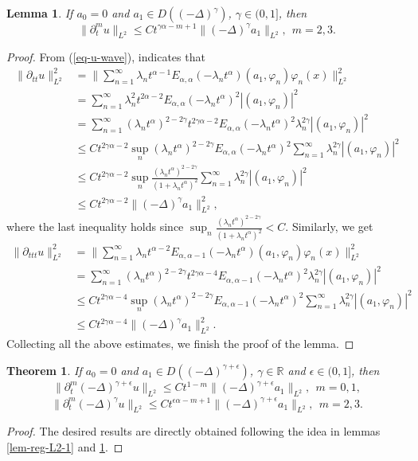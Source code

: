 \documentclass[11pt]{article}
\newtheorem{theorem}{Theorem}
\newtheorem{lemma}{Lemma}[section]
\numberwithin{equation}{section}
\begin{document}
\begin{lemma}\label{lem-reg-L2-2}
If $a_0=0$ and $a_1\in D((-\Delta)^{\gamma})$, $\gamma\in(0,1]$, then
\[
\|\partial_t^mu\|_{L^2}\le Ct^{\gamma\alpha-m+1}\|(-\Delta)^{\gamma}a_1\|_{L^2},~~m=2,3.
\]
\end{lemma}
\begin{proof}
From (\ref{eq-u-wave}), indicates that
\begin{align*}
\|\partial_{tt}u\|_{L^2}^2
& = \bigg\|\sum_{n=1}^{\infty}  \lambda_nt^{\alpha-1}E_{\alpha,\alpha}(-\lambda_n t^\alpha)(a_1, \varphi_n) \varphi_n(x)\bigg\|_{L^2}^2\\
& =\sum_{n=1}^{\infty}  \lambda_n^2t^{2\alpha-2}E_{\alpha,\alpha}(-\lambda_n t^\alpha)^2|(a_1, \varphi_n)|^2\\
& = \sum_{n=1}^{\infty}  (\lambda_nt^\alpha)^{2-2\gamma}t^{2\gamma\alpha-2}E_{\alpha,\alpha}(-\lambda_n t^\alpha)^2\lambda_n^{2\gamma}|(a_1, \varphi_n)|^2\\
& \le Ct^{2\gamma\alpha-2}\sup_n(\lambda_nt^\alpha)^{2-2\gamma}E_{\alpha,\alpha}(-\lambda_n t^\alpha)^2\sum_{n=1}^{\infty}\lambda_n^{2\gamma}|(a_1, \varphi_n)|^2\\
& \le Ct^{2\gamma\alpha-2}\sup_n\frac{(\lambda_nt^\alpha)^{2-2\gamma}}{(1+\lambda_nt^\alpha)^2}\sum_{n=1}^{\infty}\lambda_n^{2\gamma}|(a_1, \varphi_n)|^2\\
& \le Ct^{2\gamma\alpha-2}\|(-\Delta)^\gamma a_1\|_{L^2}^2,
\end{align*}
where the last inequality holds since $\sup_n\frac{(\lambda_nt^\alpha)^{2-2\gamma}}{(1+\lambda_nt^\alpha)^2}<C$.
Similarly, we get
\begin{align*}
\|\partial_{ttt}u\|_{L^2}^2
& = \bigg\|\sum_{n=1}^{\infty}  \lambda_nt^{\alpha-2}E_{\alpha,\alpha-1}(-\lambda_n t^\alpha)(a_1, \varphi_n) \varphi_n(x)\bigg\|_{L^2}^2\\
& = \sum_{n=1}^{\infty}  (\lambda_nt^\alpha)^{2-2\gamma}t^{2\gamma\alpha-4}E_{\alpha,\alpha-1}(-\lambda_n t^\alpha)^2\lambda_n^{2\gamma}|(a_1, \varphi_n)|^2\\
& \le Ct^{2\gamma\alpha-4}\sup_n(\lambda_nt^\alpha)^{2-2\gamma}E_{\alpha,\alpha-1}(-\lambda_n t^\alpha)^2\sum_{n=1}^{\infty}\lambda_n^{2\gamma}|(a_1, \varphi_n)|^2\\
& \le Ct^{2\gamma\alpha-4}\|(-\Delta)^\gamma a_1\|_{L^2}^2.
\end{align*}
Collecting all the above estimates, we finish the proof of the lemma.
\end{proof}

\begin{theorem}\label{thm-reg-delta-1}
If $a_0=0$ and $a_1\in D((-\Delta)^{\gamma+\epsilon})$, $\gamma\in \mathbb R$ and $\epsilon \in(0,1]$, then
\[
\|\partial_t^m(-\Delta)^{\gamma+\epsilon}u\|_{L^2}\le Ct^{1-m}\|(-\Delta)^{\gamma+\epsilon}a_1\|_{L^2},~~m=0,1,
\]
\[
\|\partial_t^m(-\Delta)^{\gamma}u\|_{L^2}\le Ct^{\epsilon\alpha-m+1}\|(-\Delta)^{\gamma+\epsilon}a_1\|_{L^2},~~m=2,3.
\]
\end{theorem}
\begin{proof} The desired results are directly obtained following the idea in lemmas \ref{lem-reg-L2-1} and \ref{lem-reg-L2-2}.
\end{proof}
\end{document}
